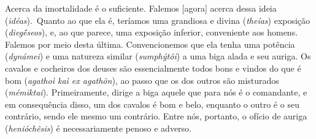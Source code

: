 \bekker{[246a]} Acerca da imortalidade é o suficiente. Falemos [agora]
acerca dessa ideia (\emph{idéas}).~Quanto ao que ela é, teríamos uma
grandiosa e divina (\emph{theías}) exposição (\emph{diegḗseos}), e, ao
que parece, uma exposição inferior, conveniente aos homens. Falemos por
meio desta última. Convencionemos que ela tenha uma potência
(\emph{dynámei}) e uma natureza similar (\emph{sumphýtôi}) a uma biga
alada e seu auriga. Os cavalos e cocheiros dos deuses são essencialmente
todos bons e vindos do que é bom (\emph{agathoì kaì ex agathôn}), ao
passo que os dos outros são misturados (\emph{mémiktai}). \bekker{[246b]}
Primeiramente, dirige a biga aquele que para nós é o comandante, e em
consequência disso, um dos cavalos é bom e belo, enquanto o outro é o seu
contrário, sendo ele mesmo um contrário. Entre nós, portanto, o ofício
de auriga (\emph{henióchêsis}) é necessariamente penoso e adverso.

